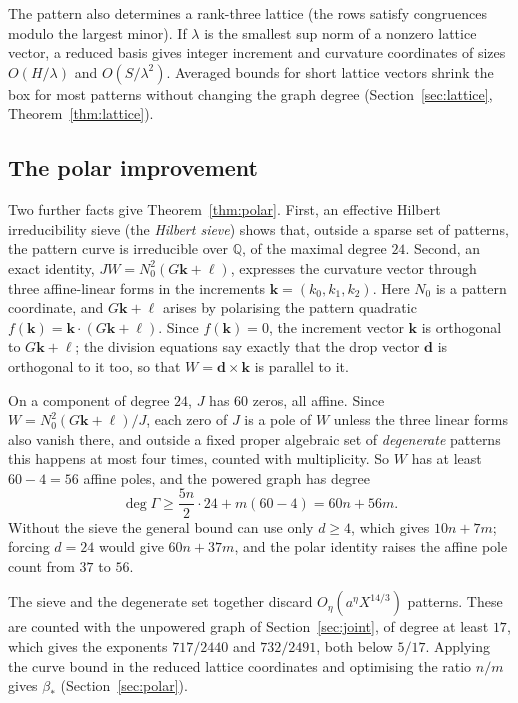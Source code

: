 \documentclass[11pt]{article}
\theoremstyle{definition}
\theoremstyle{remark}
\begin{document}
The pattern also determines a rank-three lattice (the rows satisfy
congruences modulo the largest minor). If $\lambda$ is the
smallest sup norm of a nonzero lattice vector, a reduced basis gives integer
increment and curvature coordinates of sizes $O(H/\lambda)$ and
$O(S/\lambda^2)$. Averaged bounds for short lattice vectors shrink the box
for most patterns without changing the graph degree
(Section~\ref{sec:lattice}, Theorem~\ref{thm:lattice}).

\subsection*{The polar improvement}
Two further facts give Theorem~\ref{thm:polar}. First, an effective Hilbert
irreducibility sieve (the \emph{Hilbert sieve}) shows that, outside a sparse set
of patterns, the pattern curve is irreducible over $\mathbb Q$, of the maximal
degree $24$. Second, an exact
identity, $JW=N_0^2(G\mathbf k+\ell)$, expresses the curvature vector through
three affine-linear forms in the increments $\mathbf k=(k_0,k_1,k_2)$. Here $N_0$
is a pattern coordinate, and $G\mathbf k+\ell$ arises by polarising the
pattern quadratic $f(\mathbf k)=\mathbf k\cdot(G\mathbf k+\ell)$. Since
$f(\mathbf k)=0$, the increment vector $\mathbf k$ is orthogonal to
$G\mathbf k+\ell$; the division equations say exactly that the drop vector
$\mathbf d$ is orthogonal to it too, so that $W=\mathbf d\times\mathbf k$ is
parallel to it.

On a component of degree $24$, $J$ has $60$ zeros,
all affine. Since $W=N_0^2(G\mathbf k+\ell)/J$, each zero of $J$ is a pole
of $W$ unless the three linear forms also vanish there, and outside a fixed
proper algebraic set of \emph{degenerate} patterns this happens at most four times,
counted with multiplicity. So $W$ has at least $60-4=56$ affine poles, and
the powered graph has degree
\[
 \deg\Gamma\ge\frac{5n}{2}\cdot24+m(60-4)=60n+56m.
\]
Without the sieve the general bound can use only $d\ge4$, which gives
$10n+7m$; forcing $d=24$ would give $60n+37m$, and the polar identity raises
the affine pole count from $37$ to $56$.

The sieve and the
degenerate set together discard $O_\eta(a^\eta X^{14/3})$ patterns. These are
counted with the unpowered graph of Section~\ref{sec:joint}, of degree at least
$17$, which gives the exponents $717/2440$ and $732/2491$, both below $5/17$. Applying the curve bound in the reduced
lattice coordinates and optimising the ratio $n/m$ gives $\beta_*$
(Section~\ref{sec:polar}).
\end{document}
